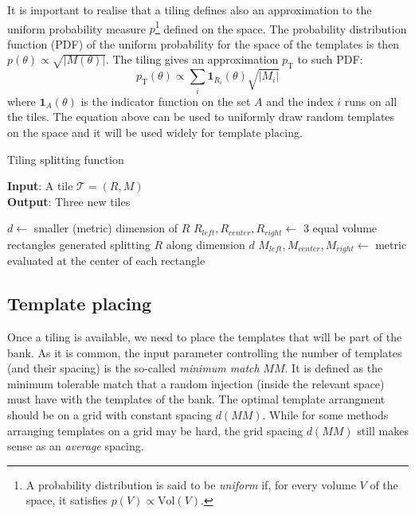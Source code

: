 \documentclass[twocolumn,showpacs,preprintnumbers,nofootinbib,prd,
superscriptaddress,10pt]{revtex4-2}
\begin{document}
It is important to realise that a tiling defines also an approximation to the uniform probability measure $p$\footnote{
A probability distribution is said to be {\it uniform} if, for every volume $V$ of the space, it satisfies $p(V) \propto \text{Vol}(V)$.}
defined on the space.
The probability distribution function (PDF) of the uniform probability for the space of the templates is then $p(\theta) \propto \sqrt{|M(\theta)|}$.
The tiling gives an approximation $p_{\text{T}}$ to such PDF:
\begin{equation}\label{eq:tiling_pdf}
	p_{\text{T}}(\theta) \propto \sum_i \mathbf{1}_{R_i}(\theta) \sqrt{|M_i|}
\end{equation}
where $\mathbf{1}_A(\theta)$ is the indicator function on the set $A$ and the index $i$ runs on all the tiles.
The equation above can be used to uniformly draw random templates on the space and it will be used widely for template placing.

\begin{algorithm}[H]
	\centering
	\caption{Tiling splitting function}\label{alg:tiling}
	\flushleft
	\hspace*{\algorithmicindent} \textbf{Input}: A tile $\mathcal{T} = \left(R, M\right)$ \\
	\hspace*{\algorithmicindent} \textbf{Output}: Three new tiles
	\begin{algorithmic}
		\State $d \gets $ smaller (metric) dimension of $R$
		\State $R_{left}, R_{center}, R_{right} \gets $ 3 equal volume rectangles generated splitting $R$ along dimension $d$ 
		\State $M_{left}, M_{center}, M_{right} \gets $ metric evaluated at the center of each rectangle
		\State{}
		\EndProcedure
	\end{algorithmic}
\end{algorithm}


\subsection{Template placing} \label{sec:template_placing}

Once a tiling is available, we need to place the templates that will be part of the bank.
As it is common, the input parameter controlling the number of templates (and their spacing) is the so-called {\it minimum match} $MM$. It is defined as the minimum tolerable match that a random injection (inside the relevant space) must have with the templates of the bank.
The optimal template arrangment should be on a grid with constant spacing $d(MM)$. While for some methods arranging templates on a grid may be hard, the grid spacing $d(MM)$ still makes sense as an {\it average} spacing.
\end{document}
